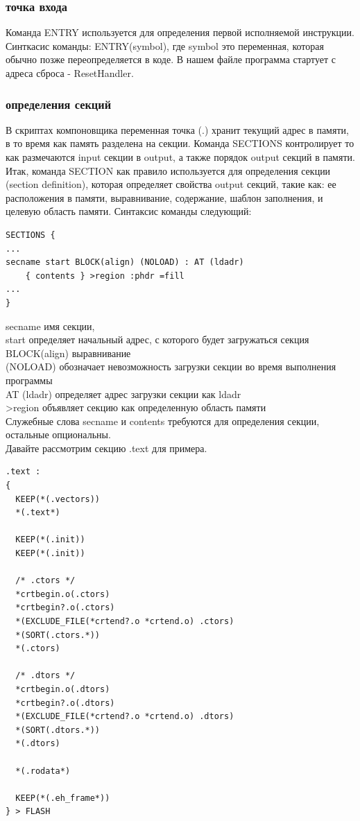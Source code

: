 \documentclass[12pt,a4paper]{article}
\begin{document}
\subsubsection{точка входа}
    Команда ENTRY используется для определения первой исполняемой инструкции.
    Синткасис команды: ENTRY(symbol), где symbol это переменная, которая обычно
    позже переопределяется в коде. В нашем файле программа стартует с адреса
    сброса - Reset\textunderscore Handler.
\subsubsection{определения секций}
    В скриптах компоновщика переменная точка (.) хранит текущий адрес в памяти,
    в то время как память разделена на секции.
    Команда SECTIONS контролирует то как размечаются input секции в output,
    а также порядок output секций в памяти. Итак, команда SECTION как правило
    используется для определения секции (section definition), которая определяет
    свойства output секций, такие как: ее расположения в памяти, выравнивание,
    содержание, шаблон заполнения, и целевую область памяти. Синтаксис команды
    следующий:
\begin{lstlisting}
SECTIONS {
...
secname start BLOCK(align) (NOLOAD) : AT (ldadr)
    { contents } >region :phdr =fill
...
}
\end{lstlisting}
secname имя секции,\\
start определяет начальный адрес, с которого будет загружаться секция\\
BLOCK(align) выравнивание\\
(NOLOAD) обозначает невозможность загрузки секции во время выполнения программы\\
AT (ldadr) определяет адрес загрузки секции как ldadr\\
>region объявляет секцию как определенную область памяти\\
Служебные слова secname и contents требуются для определения секции, остальные
опциональны.\\
Давайте рассмотрим секцию .text для примера.\\
\begin{lstlisting}
.text :
{
  KEEP(*(.vectors))
  *(.text*)

  KEEP(*(.init))
  KEEP(*(.init))

  /* .ctors */
  *crtbegin.o(.ctors)
  *crtbegin?.o(.ctors)
  *(EXCLUDE_FILE(*crtend?.o *crtend.o) .ctors)
  *(SORT(.ctors.*))
  *(.ctors)

  /* .dtors */
  *crtbegin.o(.dtors)
  *crtbegin?.o(.dtors)
  *(EXCLUDE_FILE(*crtend?.o *crtend.o) .dtors)
  *(SORT(.dtors.*))
  *(.dtors)

  *(.rodata*)

  KEEP(*(.eh_frame*))
} > FLASH
\end{lstlisting}
\end{document}
